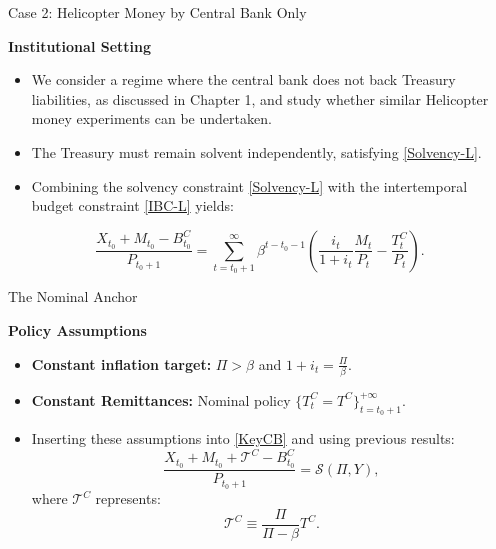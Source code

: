 \documentclass[11pt,aspectratio=169]{beamer}
\begin{document}
\begin{frame}{Case 2: Helicopter Money by Central Bank  Only}
\small

\textbf{Institutional Setting}
 \vspace{0.2cm}
\begin{itemize}
    \item We consider a regime where the central bank  does not back Treasury liabilities, as discussed in Chapter 1, and study whether similar Helicopter money experiments can be undertaken.
    \vspace{0.2cm}
    \item The Treasury must remain solvent independently, satisfying \eqref{Solvency-L}.
    \vspace{0.2cm}
    \item Combining the solvency constraint \eqref{Solvency-L} with the intertemporal budget constraint \eqref{IBC-L} yields:
\end{itemize}

\begin{equation}
\frac{X_{t_{0}}+M_{t_{0}}-B_{t_{0}}^{C}}{P_{t_{0}+1}}=\sum_{t=t_{0}+1}^{\infty }\beta ^{t-t_{0}-1}\left( \frac{i_{t}}{1+i_{t}}\frac{M_{t}}{P_{t}}-\frac{T_{t}^{C}}{P_{t}}\right). \label{KeyCB}
\end{equation}
\end{frame}

\begin{frame}{The Nominal Anchor}
\small

\textbf{Policy Assumptions}
 \vspace{0.2cm}
\begin{itemize}
    \item \textbf{Constant inflation target:} $\Pi > \beta$ and $1+i_t = \frac{\Pi}{\beta}$.
    \item \textbf{Constant Remittances:} Nominal policy $\{T_{t}^{C}=T^{C}\}_{t=t_{0}+1}^{+\infty }$.
\end{itemize}

\vspace{0.2cm}
\begin{itemize}
    \item Inserting these assumptions into \eqref{KeyCB} and using previous results:
    \begin{equation*}
        \frac{X_{t_{0}}+M_{t_{0}}+\mathcal{T}^{C}-B_{t_{0}}^{C}}{P_{t_{0}+1}} = \mathcal{S}(\Pi ,Y),
    \end{equation*}
    where $\mathcal{T}^{C}$ represents:
    \begin{equation}
        \mathcal{T}^{C} \equiv \frac{\Pi}{\Pi-\beta} T^{C}.
    \end{equation}
\end{itemize}
\end{frame}
\end{document}
